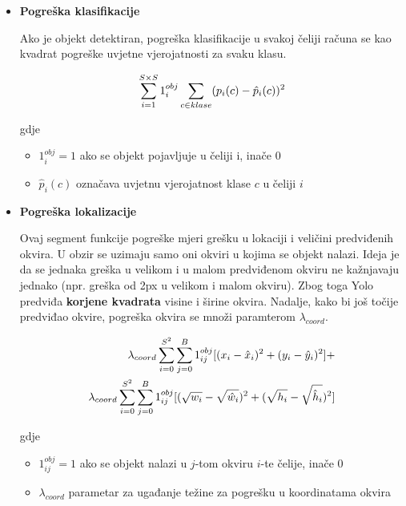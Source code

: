 \begin{itemize}
	\item{\textbf{Pogreška klasifikacije}}
	
	Ako je objekt detektiran, pogreška klasifikacije u svakoj čeliji računa se kao kvadrat pogreške uvjetne vjerojatnosti za svaku klasu.
	
	\begin{equation}
		\centering
		\sum_{i=1}^{S\times S} 1_i^{obj} \sum_{c \in klase} (p_i(c) - \hat{p}_i(c))^2
		\label{eq:classification-loss}
	\end{equation}
	
	gdje 
	\begin{itemize}
		\item $1_i^{obj} = 1$ ako se objekt pojavljuje u čeliji i, inače $0$
		\item $\hat{p}_i(c)$ označava uvjetnu vjerojatnost klase $c$ u čeliji $i$
	\end{itemize}
	
	\item{\textbf{Pogreška lokalizacije}}
	
	Ovaj segment funkcije pogreške mjeri grešku u lokaciji i veličini predviđenih okvira. U obzir se uzimaju samo oni okviri u kojima se objekt nalazi. Ideja je da se jednaka greška u velikom i u malom predviđenom okviru ne kažnjavaju jednako (npr. greška od 2px u velikom i malom okviru). Zbog toga Yolo predviđa \textbf{korjene kvadrata} visine i širine okvira. Nadalje, kako bi još točije predviđao okvire, pogreška okvira se množi paramterom $\lambda_{coord}$.
	
	\begin{align}
		\centering
		\begin{split}
			\lambda_{coord}\sum_{i=0}^{S^2}\sum_{j=0}^{B} 1_{ij}^{obj} [(x_i - \hat{x}_i)^2 + (y_i - \hat{y}_i)^2] + \\
			\lambda_{coord}\sum_{i=0}^{S^2}\sum_{j=0}^{B} 1_{ij}^{obj} [(\sqrt{w_i} - \sqrt{\hat{w}_i})^2 + (\sqrt{h_i} - \sqrt{\hat{h}_i})^2]
		\end{split}
		\label{eq:localization-loss}
	\end{align}
	
	gdje 
	\begin{itemize}
		\item $1_{ij}^{obj} = 1$ ako se objekt nalazi u $j$-tom okviru $i$-te čelije, inače $0$
		\item $\lambda_{coord}$ parametar za ugađanje težine za pogrešku u koordinatama okvira
	\end{itemize}
	

\end{itemize}
